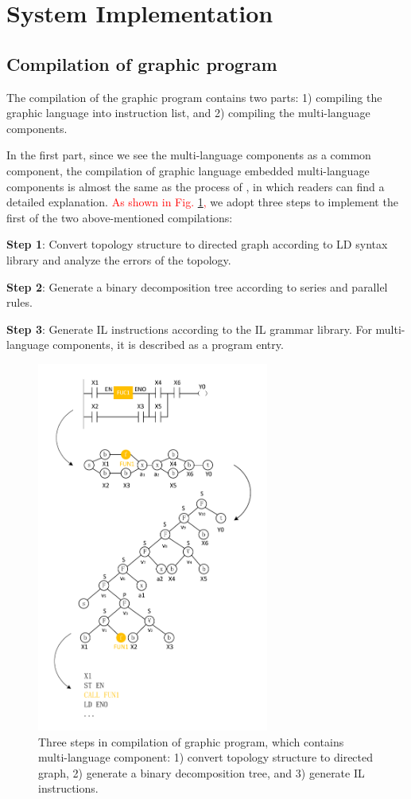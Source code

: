 \documentclass[journal,UTF8]{IEEEtran}
\begin{document}
	\section{System Implementation}
	\label{Process}
	\subsection{Compilation of graphic program}
	The compilation of the graphic program contains two parts: 1) compiling the graphic language into instruction list, and 2) compiling the multi-language components.
	
	In the first part, since we see the multi-language components as a common component, the compilation of graphic language embedded multi-language components is almost the same as the process of \cite{Yan2010Compiling}, in which readers can find a detailed explanation. \textcolor{red}{As shown in Fig. \ref{fig:Compile},} we adopt three steps to implement the first of the two above-mentioned compilations:
	
	\textbf{Step 1}: Convert topology structure to directed graph according to LD syntax library and analyze the errors of the topology.
	
	\textbf{Step 2}: Generate a binary decomposition tree according to series and parallel rules.
	
	\textbf{Step 3}: Generate IL instructions according to the IL grammar library. For multi-language components, it is described as a program entry.
	
	\begin{figure}
		\centering
		\includegraphics[width=3in]{fig/Compile.pdf}
		\caption{Three steps in compilation of graphic program, which contains multi-language component: 1) convert topology structure to directed graph, 2) generate a binary decomposition tree, and 3) generate IL instructions.}
		\label{fig:Compile}
	\end{figure}
	
\end{document}
